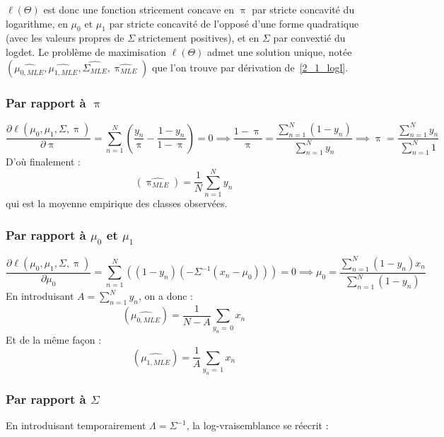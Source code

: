 \documentclass[12pt,a4paper,onecolumn]{article}
\begin{document}
\( \ell(\Theta) \) est donc une fonction stricement concave en \( \uppi\) par stricte concavité du logarithme, en \( \mu_0 \) et \( \mu_1 \) par stricte concavité de l'opposé d'une forme quadratique (avec les valeurs propres de  \( \Sigma \) strictement positives), et en \( \Sigma \) par convextié du logdet.
Le problème de maximisation \( \ell(\Theta) \) admet une solution unique, notée \( (\widehat{\mu_{0, MLE}}, \widehat{\mu_{1, MLE}}, \widehat{\Sigma_{MLE}}, \widehat{\uppi_{MLE}}) \) que l'on trouve par dérivation de~\eqref{2_1_logl}.

\subsubsection{Par rapport à \protect \(\uppi \)}

\[
	\frac{\partial \ell(\mu_0, \mu_1, \Sigma, \uppi)}{\partial \uppi} = 	\sum_{n = 1}^N\left( \frac{y_n}{\uppi} - \frac{1 - y_n}{1 - \uppi} \right) = 0
	\implies \frac{1- \uppi}{\uppi} = \frac{\sum_{n = 1}^N (1 - y_n)}{\sum_{n = 1}^N y_n}
	\implies \uppi = \frac{\sum_{n = 1}^N y_n}{\sum_{n = 1}^N 1}
\]
D'où finalement :
\begin{equation}
	\left(\widehat{\uppi_{MLE}}\right) = \frac{1}{N}\sum_{n = 1}^N y_n
	\label{2_1_pi}
\end{equation}
qui est la moyenne empirique des classes observées.

\subsubsection{Par rapport à \protect \(\mu_0 \) et \protect \(\mu_1 \)}
\[
	\frac{\partial \ell(\mu_0, \mu_1, \Sigma, \uppi)}{\partial \mu_0} = 	\sum_{n = 1}^N\left((1 - y_n)(- \Sigma^{-1}(x_n - \mu_0)) \right) = 0
	\implies \mu_0 = \frac{\sum_{n = 1}^N (1 - y_n)x_n}{\sum_{n = 1}^N (1 - y_n)}
\]
En introduisant \( A = \sum_{n = 1}^N y_n\), on a donc :
\begin{equation}
	\left(\widehat{\mu_{0,MLE}}\right) = \frac{1}{N - A}\sum_{y_n =\,0} x_n
	\label{2_1_mu0}
\end{equation}
Et de la même façon :
\begin{equation}
	\left(\widehat{\mu_{1,MLE}}\right) = \frac{1}{A}\sum_{y_n =\,1} x_n
	\label{2_1_mu1}
\end{equation}

\subsubsection{Par rapport à \protect\( \Sigma\)}
En introduisant temporairement \( \Lambda = \Sigma^{-1}\), la log-vraisemblance se réecrit :
\end{document}
